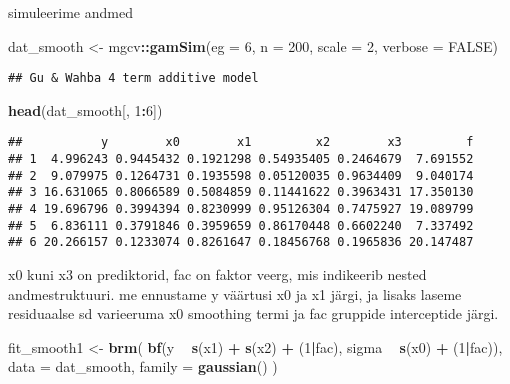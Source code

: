 \documentclass[]{article}
\newenvironment{Shaded}{\begin{snugshade}}{\end{snugshade}}
\newcommand{\KeywordTok}[1]{\textcolor[rgb]{0.13,0.29,0.53}{\textbf{#1}}}
\newcommand{\DataTypeTok}[1]{\textcolor[rgb]{0.13,0.29,0.53}{#1}}
\newcommand{\DecValTok}[1]{\textcolor[rgb]{0.00,0.00,0.81}{#1}}
\newcommand{\StringTok}[1]{\textcolor[rgb]{0.31,0.60,0.02}{#1}}
\newcommand{\OtherTok}[1]{\textcolor[rgb]{0.56,0.35,0.01}{#1}}
\newcommand{\OperatorTok}[1]{\textcolor[rgb]{0.81,0.36,0.00}{\textbf{#1}}}
\newcommand{\NormalTok}[1]{#1}
\begin{document}
simuleerime andmed

\begin{Shaded}
\begin{Highlighting}[]
\NormalTok{dat_smooth <-}\StringTok{ }\NormalTok{mgcv}\OperatorTok{::}\KeywordTok{gamSim}\NormalTok{(}\DataTypeTok{eg =} \DecValTok{6}\NormalTok{, }\DataTypeTok{n =} \DecValTok{200}\NormalTok{, }\DataTypeTok{scale =} \DecValTok{2}\NormalTok{, }\DataTypeTok{verbose =} \OtherTok{FALSE}\NormalTok{)}
\end{Highlighting}
\end{Shaded}

\begin{verbatim}
## Gu & Wahba 4 term additive model
\end{verbatim}

\begin{Shaded}
\begin{Highlighting}[]
\KeywordTok{head}\NormalTok{(dat_smooth[, }\DecValTok{1}\OperatorTok{:}\DecValTok{6}\NormalTok{])}
\end{Highlighting}
\end{Shaded}

\begin{verbatim}
##           y        x0        x1         x2        x3         f
## 1  4.996243 0.9445432 0.1921298 0.54935405 0.2464679  7.691552
## 2  9.079975 0.1264731 0.1935598 0.05120035 0.9634409  9.040174
## 3 16.631065 0.8066589 0.5084859 0.11441622 0.3963431 17.350130
## 4 19.696796 0.3994394 0.8230999 0.95126304 0.7475927 19.089799
## 5  6.836111 0.3791846 0.3959659 0.86170448 0.6602240  7.337492
## 6 20.266157 0.1233074 0.8261647 0.18456768 0.1965836 20.147487
\end{verbatim}

x0 kuni x3 on prediktorid, fac on faktor veerg, mis indikeerib nested
andmestruktuuri. me ennustame y väärtusi x0 ja x1 järgi, ja lisaks
laseme residuaalse sd varieeruma x0 smoothing termi ja fac gruppide
interceptide järgi.

\begin{Shaded}
\begin{Highlighting}[]
\NormalTok{fit_smooth1 <-}\StringTok{ }\KeywordTok{brm}\NormalTok{(}
  \KeywordTok{bf}\NormalTok{(y }\OperatorTok{~}\StringTok{ }\KeywordTok{s}\NormalTok{(x1) }\OperatorTok{+}\StringTok{ }\KeywordTok{s}\NormalTok{(x2) }\OperatorTok{+}\StringTok{ }\NormalTok{(}\DecValTok{1}\OperatorTok{|}\NormalTok{fac), sigma }\OperatorTok{~}\StringTok{ }\KeywordTok{s}\NormalTok{(x0) }\OperatorTok{+}\StringTok{ }\NormalTok{(}\DecValTok{1}\OperatorTok{|}\NormalTok{fac)),}
  \DataTypeTok{data =}\NormalTok{ dat_smooth, }\DataTypeTok{family =} \KeywordTok{gaussian}\NormalTok{()}
\NormalTok{)}
\end{Highlighting}
\end{Shaded}
\end{document}
